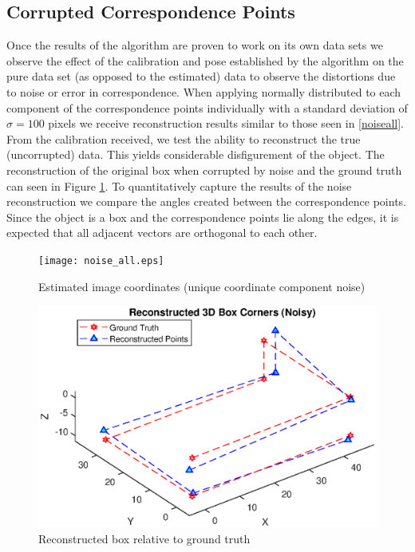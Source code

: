 \documentclass[12pt]{article}
\begin{document}
\subsection{Corrupted Correspondence Points}
 Once the results of the algorithm are proven to work on its own data sets we observe the effect of the calibration and pose established by the algorithm on the pure data set (as opposed to the estimated) data to observe the distortions due to noise or error in correspondence. When applying normally distributed to each component of the correspondence points individually with a standard deviation of $\sigma = 100$ pixels we receive reconstruction results similar to those seen in \ref{noiseall}. From the calibration received, we test the ability to reconstruct the true (uncorrupted) data. This yields considerable disfigurement of the object. The reconstruction of the original box when corrupted by noise and the ground truth can seen in Figure \ref{noiseallrecon}.  To quantitatively capture the results of the noise reconstruction we compare the angles created between the correspondence points. Since the object is a box and the correspondence points lie along the edges, it is expected that all adjacent vectors are orthogonal to each other. 

\begin{figure}[h]
	\centering %
	\captionsetup{justification=centering}
	\begin{minipage}{0.5\textwidth}
		\centering
		\texttt{[image: noise\_all.eps]}
		\caption{Estimated image coordinates \newline(unique coordinate component noise)} \label{noiseall}
	\end{minipage}\hfill
	\begin{minipage}{0.5\textwidth}
		\centering %
		\includegraphics[width=1\textwidth]{noise_all_recon.eps}
		\caption{Reconstructed box relative to ground truth} \label{noiseallrecon}
	\end{minipage}
\end{figure}
\end{document}
